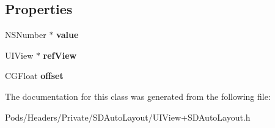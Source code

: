 \subsection*{Properties}
\begin{DoxyCompactItemize}
\item 
\mbox{\label{interface_s_d_auto_layout_model_item_aa5f646b324c40e34a542f2780853a1cd}} 
N\+S\+Number $\ast$ {\bfseries value}
\item 
\mbox{\label{interface_s_d_auto_layout_model_item_a906ece1d1891c18c30b9610a57acb047}} 
U\+I\+View $\ast$ {\bfseries ref\+View}
\item 
\mbox{\label{interface_s_d_auto_layout_model_item_ae2cbb98003d86f6775722aa5ed07d38d}} 
C\+G\+Float {\bfseries offset}
\end{DoxyCompactItemize}


The documentation for this class was generated from the following file\+:\begin{DoxyCompactItemize}
\item 
Pods/\+Headers/\+Private/\+S\+D\+Auto\+Layout/U\+I\+View+\+S\+D\+Auto\+Layout.\+h\end{DoxyCompactItemize}
